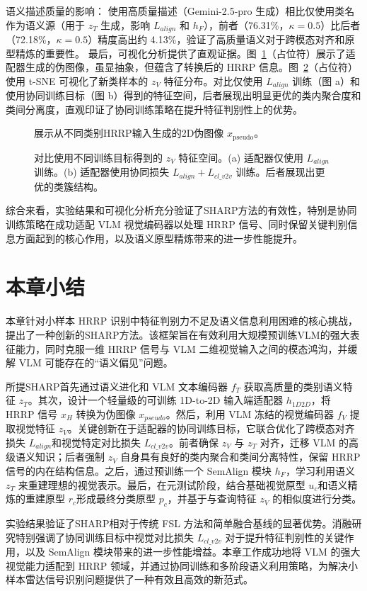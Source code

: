 语义描述质量的影响： 使用高质量描述（Gemini-2.5-pro 生成）相比仅使用类名作为语义源（用于 $z_T$ 生成，影响 $L_{align}$ 和 $h_F$），前者（76.31\%，$\kappa=0.5$）比后者（72.18\%，$\kappa=0.5$）精度高出约 4.13\%，验证了高质量语义对于跨模态对齐和原型精炼的重要性。 最后，可视化分析提供了直观证据。图~\ref{fig:pseudo_images_semantic}（占位符）展示了适配器生成的伪图像，虽显抽象，但蕴含了转换后的 HRRP 信息。图~\ref{fig:tsne_adapter_semantic}（占位符）使用 t-SNE 可视化了新类样本的 $z_V$ 特征分布。对比仅使用 $L_{align}$ 训练（图 a）和使用协同训练目标（图 b）得到的特征空间，后者展现出明显更优的类内聚合度和类间分离度，直观印证了协同训练策略在提升特征判别性上的优势。
 
 \begin{figure}[h!]
 \centering 
  \caption{展示从不同类别HRRP输入生成的2D伪图像 $x_{\text{pseudo}}$。} \label{fig:pseudo_images_semantic} 
 \end{figure} 
 
 \begin{figure}[h!] 
 \centering 
 \caption{对比使用不同训练目标得到的 $z_V$ 特征空间。(a) 适配器仅使用 $L_{align}$ 训练。(b) 适配器使用协同损失 $L_{align} + L_{cl\_v2v}$ 训练。后者展现出更优的类簇结构。} \label{fig:tsne_adapter_semantic} \end{figure} 
 
综合来看，实验结果和可视化分析充分验证了SHARP方法的有效性，特别是协同训练策略在成功适配 VLM 视觉编码器以处理 HRRP 信号、同时保留关键判别信息方面起到的核心作用，以及语义原型精炼带来的进一步性能提升。
 
\section{本章小结}
\label{sec:semantic_summary}

本章针对小样本 HRRP 识别中特征判别力不足及语义信息利用困难的核心挑战，提出了一种创新的SHARP方法。该框架旨在有效利用大规模预训练VLM的强大表征能力，同时克服一维 HRRP 信号与 VLM 二维视觉输入之间的模态鸿沟，并缓解 VLM 可能存在的“语义偏见”问题。 

所提SHARP首先通过语义进化和 VLM 文本编码器 $f_T$ 获取高质量的类别语义特征 $z_T$。其次，设计一个轻量级的可训练 1D-to-2D 输入端适配器 $h_{1D2D}$，将 HRRP 信号 $x_H$ 转换为伪图像 $x_{pseudo}$。然后，利用 VLM 冻结的视觉编码器 $f_V$ 提取视觉特征 $z_V$。关键创新在于适配器的协同训练目标，它联合优化了跨模态对齐损失 $L_{align}$和视觉特定对比损失 $L_{cl\_v2v}$。前者确保 $z_V$ 与 $z_T$ 对齐，迁移 VLM 的高级语义知识；后者强制 $z_V$ 自身具有良好的类内聚合和类间分离特性，保留 HRRP 信号的内在结构信息。之后，通过预训练一个 SemAlign 模块 $h_F$，学习利用语义 $z_T$ 来重建理想的视觉表示。最后，在元测试阶段，结合基础视觉原型 $u_c$和语义精炼的重建原型 $r_c$形成最终分类原型 $p_c$，并基于与查询特征 $z_V$ 的相似度进行分类。

实验结果验证了SHARP相对于传统 FSL 方法和简单融合基线的显著优势。消融研究特别强调了协同训练目标中视觉对比损失 $L_{cl\_v2v}$ 对于提升特征判别性的关键作用，以及 SemAlign 模块带来的进一步性能增益。本章工作成功地将 VLM 的强大视觉能力适配到 HRRP 领域，并通过协同训练和多阶段语义利用策略，为解决小样本雷达信号识别问题提供了一种有效且高效的新范式。